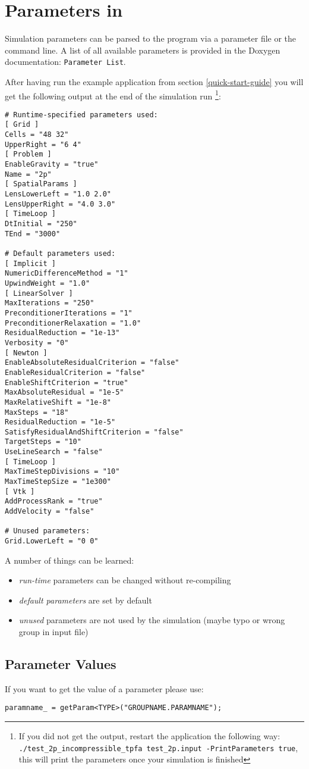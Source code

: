 \section{Parameters in \Dumux}
\label{sc_parameterfiles}
Simulation parameters can be parsed to the program via a parameter file or the command line.
A list of all available parameters is provided in the Doxygen documentation: \texttt{Parameter List}.

After having run the example application from section \ref{quick-start-guide} you will
get the following output at the end of the simulation run
\footnote{If you did not get the output, restart the application the following way:
\texttt{./test{\_}2p{\_}incompressible{\_}tpfa test{\_}2p.input -PrintParameters true},
this will print the parameters once your simulation is finished}:
\begin{lstlisting}[style=Bash]
# Runtime-specified parameters used:
[ Grid ]
Cells = "48 32"
UpperRight = "6 4"
[ Problem ]
EnableGravity = "true"
Name = "2p"
[ SpatialParams ]
LensLowerLeft = "1.0 2.0"
LensUpperRight = "4.0 3.0"
[ TimeLoop ]
DtInitial = "250"
TEnd = "3000"

# Default parameters used:
[ Implicit ]
NumericDifferenceMethod = "1"
UpwindWeight = "1.0"
[ LinearSolver ]
MaxIterations = "250"
PreconditionerIterations = "1"
PreconditionerRelaxation = "1.0"
ResidualReduction = "1e-13"
Verbosity = "0"
[ Newton ]
EnableAbsoluteResidualCriterion = "false"
EnableResidualCriterion = "false"
EnableShiftCriterion = "true"
MaxAbsoluteResidual = "1e-5"
MaxRelativeShift = "1e-8"
MaxSteps = "18"
ResidualReduction = "1e-5"
SatisfyResidualAndShiftCriterion = "false"
TargetSteps = "10"
UseLineSearch = "false"
[ TimeLoop ]
MaxTimeStepDivisions = "10"
MaxTimeStepSize = "1e300"
[ Vtk ]
AddProcessRank = "true"
AddVelocity = "false"

# Unused parameters:
Grid.LowerLeft = "0 0"
\end{lstlisting}

A number of things can be learned:
\begin{itemize}
  \item \emph{run-time} parameters can be changed without re-compiling
  \item \emph{default parameters} are set by default
  \item \emph{unused} parameters are not used by the simulation (maybe typo or wrong group in input file)
\end{itemize}


\subsection{Parameter Values}
If you want to get the value of a parameter please use:
\begin{lstlisting}[name=propsyscars,style=DumuxCode]
paramname_ = getParam<TYPE>("GROUPNAME.PARAMNAME");
\end{lstlisting}

